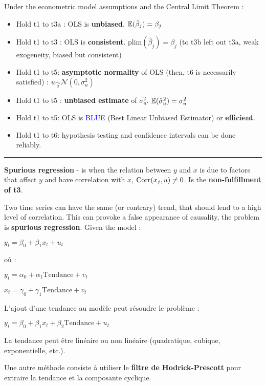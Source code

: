 \begin{f}
	
Under the econometric model assumptions and the Central Limit Theorem :

\begin{itemize}[leftmargin=*]
	\item Hold t1 to t3a : OLS is \textbf{unbiased}. $\mathbb{E}(\hat{\beta}_{j}) = \beta_{j}$
	\item Hold t1 to t3 : OLS is \textbf{consistent}. $\mathrm{plim}(\hat{\beta}_{j}) = \beta_{j}$ (to t3b left out t3a, weak exogeneity, biased but consistent)
	\item Hold t1 to t5: \textbf{asymptotic normality} of OLS (then, t6 is necessarily satisfied) : $u \underset{a}{\sim}\mathcal{N}(0, \sigma^{2}_{u})$
	\item Hold t1 to t5 : \textbf{unbiased estimate} of $\sigma^{2}_{u}$. $\mathbb{E}(\hat{\sigma}^{2}_{u}) = \sigma^{2}_{u}$
	\item Hold t1 to t5: OLS is \textcolor{blue}{BLUE} (Best Linear Unbiased Estimator) or \textbf{efficient}.
	\item Hold t1 to t6: hypothesis testing and confidence intervals can be done reliably.
\end{itemize}


\end{f}  \hrule

\begin{f}

\textbf{Spurious regression} - is when the relation between $y$ and $x$ is due to factors that affect $y$ and have correlation with $x$, $\mathrm{Corr}(x_{j}, u) \neq 0$. Is the \textbf {non-fulfillment of t3}.



Two time series can have the same (or contrary) trend, that should lend to a high level of correlation. This can provoke a false appearance of causality, the problem is \textbf{spurious regression}. Given the model :
%
\begin{center}
	$y_{t} = \beta_{0} + \beta_{1} x_{t} + u_{t}$
\end{center}
où :
\begin{center}
	$y_{t} = \alpha_{0} + \alpha_{1} \mathrm{Tendance} + v_{t}$
	
	$x_{t} = \gamma_{0} + \gamma_{1} \mathrm{Tendance} + v_{t}$
\end{center}
L'ajout d'une tendance au modèle peut résoudre le problème :
\begin{center}
	$y_{t} = \beta_{0} + \beta_{1} x_{t} + \beta_{2} \mathrm{Tendance} + u_{t}$
\end{center}
La tendance peut être linéaire ou non linéaire (quadratique, cubique, exponentielle, etc.).

Une autre méthode consiste à utiliser le \textbf{filtre de Hodrick-Prescott} pour extraire la tendance et la composante cyclique.

\end{f}    

